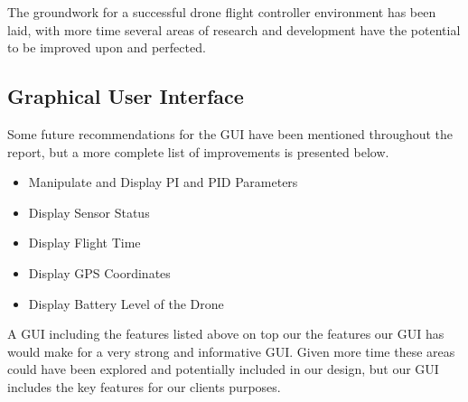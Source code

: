 The groundwork for a successful drone flight controller environment has been laid, with more time several areas of research and development have the potential to be improved upon and perfected.


\subsection{Graphical User Interface}
Some future recommendations for the GUI have been mentioned throughout the report, but a more complete list of improvements is presented below. 

\begin{itemize}
	\item Manipulate and Display PI and PID Parameters
	\item Display Sensor Status
	\item Display Flight Time
	\item Display GPS Coordinates
	\item Display Battery Level of the Drone
\end{itemize}

A GUI including the features listed above on top our the features our GUI has would make for a very strong and informative GUI. Given more time these areas could have been explored and potentially included in our design, but our GUI includes the key features for our clients purposes.
